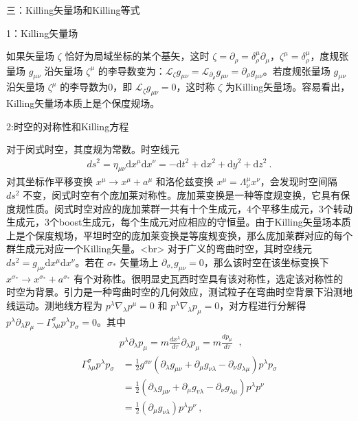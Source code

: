 三：Killing矢量场和Killing等式

1：Killing矢量场

如果矢量场 $\zeta$ 恰好为局域坐标的某个基矢，这时 $\zeta=\partial_{\rho}=\delta_{\rho}^{\mu} \partial_{\mu}$，$\zeta^{\mu}=\delta_{\rho}^{\mu}$，度规张量场 $g_{\mu \nu}$ 沿矢量场 $\zeta^{\mu}$ 的李导数变为：$\mathcal{L}_{\zeta} g_{\mu \nu} =\mathcal{L}_{\partial_{\rho}} g_{\mu \nu}=\partial_{\rho} g_{\mu \nu}$。若度规张量场 $g_{\mu \nu}$ 沿矢量场 $\zeta^{\mu}$ 的李导数为0，即 $\mathcal{L}_{\zeta} g_{\mu \nu} =0$，这时称 $\zeta$ 为Killing矢量场。容易看出，Killing矢量场本质上是个保度规场。

2:时空的对称性和Killing方程

对于闵式时空，其度规为常数。时空线元
$$\begin{aligned}
d s^{2}=\eta_{\mu \nu} \mathrm{d} x^{\mu} \mathrm{d} x^{\nu}=-\mathrm{d} t^{2}+\mathrm{d} x^{2}+\mathrm{d} y^{2}+\mathrm{d} z^{2}~.
\end{aligned}$$
对其坐标作平移变换 $x^{\mu}\rightarrow x^{\mu}+a^{\mu}$ 和洛伦兹变换 $x^{\mu}=\Lambda^{\mu}_{\nu} x^{\nu}$，会发现时空间隔 $d s^{2}$ 不变，闵式时空有个庞加莱对称性。庞加莱变换是一种等度规变换，它具有保度规性质。闵式时空对应的庞加莱群一共有十个生成元，4个平移生成元，3个转动生成元，3个boost生成元，每个生成元对应相应的守恒量。由于Killing矢量场本质上是个保度规场，平坦时空的庞加莱变换是等度规变换，那么庞加莱群对应的每个群生成元对应一个Killing矢量。<br>
对于广义的弯曲时空，其时空线元 $d s^{2}=g_{\mu \nu} \mathrm{d} x^{\mu} \mathrm{d} x^{\nu}$。若在 $\sigma_{*}$ 矢量场上 $\partial_{\sigma_{*}} g_{\mu \nu}=0$，那么该时空在该坐标变换下 $x^{\sigma_{*}} \rightarrow x^{\sigma_{*}}+a^{\sigma_{*}}$ 有个对称性。很明显史瓦西时空具有该对称性，选定该对称性的时空为背景。引力是一种弯曲时空的几何效应，测试粒子在弯曲时空背景下沿测地线运动。测地线方程为 $p^{\lambda} \nabla_{\lambda} p^{\mu}=0$ 和 $p^{\lambda} \nabla_{\lambda} p_{\mu}=0$，对方程进行分解得 $p^{\lambda} \partial_{\lambda} p_{\mu}-\Gamma_{\lambda \mu}^{\sigma} p^{\lambda} p_{\sigma}=0$。其中$$\begin{aligned}
p^{\lambda} \partial_{\lambda} p_{\mu}=m \frac{d x^{\lambda}}{d \tau} \partial_{\lambda} p_{\mu}=m \frac{d p_{\mu}}{d \tau}\end{aligned}~,$$
$$\begin{aligned}
\Gamma_{\lambda \mu}^{\sigma} p^{\lambda} p_{\sigma} &=\frac{1}{2} g^{\sigma \nu}\left(\partial_{\lambda} g_{\mu \nu}+\partial_{\mu} g_{\nu\lambda}-\partial_{\nu} g_{\lambda \mu}\right) p^{\lambda} p_{\sigma} \\
&=\frac{1}{2}\left(\partial_{\lambda} g_{\mu \nu}+\partial_{\mu} g_{v \lambda}-\partial_{\nu} g_{\lambda \mu}\right) p^{\lambda} p^{\nu} \\
&=\frac{1}{2}\left(\partial_{\mu} g_{\nu \lambda}\right) p^{\lambda} p^{\nu}~,
\end{aligned}$$
